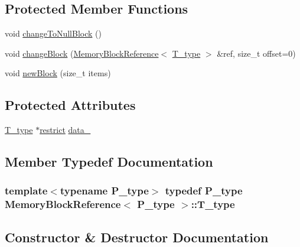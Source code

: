 \subsection*{Protected Member Functions}
\begin{DoxyCompactItemize}
\item 
void \hyperlink{classMemoryBlockReference_ae3e3d72bd8f0fe616f4cd5e7cd3edc3d}{change\+To\+Null\+Block} ()
\item 
void \hyperlink{classMemoryBlockReference_abfef63aad616c86184a56e0568007cd0}{change\+Block} (\hyperlink{classMemoryBlockReference}{Memory\+Block\+Reference}$<$ \hyperlink{classMemoryBlockReference_abf67312980afa9874edcdacc5d3f3eb3}{T\+\_\+type} $>$ \&ref, size\+\_\+t offset=0)
\item 
void \hyperlink{classMemoryBlockReference_aababf2bfce2ddec2da4406309da250dc}{new\+Block} (size\+\_\+t items)
\end{DoxyCompactItemize}
\subsection*{Protected Attributes}
\begin{DoxyCompactItemize}
\item 
\hyperlink{classMemoryBlockReference_abf67312980afa9874edcdacc5d3f3eb3}{T\+\_\+type} $\ast$\hyperlink{compiler_8h_a080abdcb9c02438f1cd2bb707af25af8}{restrict} \hyperlink{classMemoryBlockReference_aa357e2cf55a9eac0da062e7e0c27a07a}{data\+\_\+}
\end{DoxyCompactItemize}


\subsection{Member Typedef Documentation}
\hypertarget{classMemoryBlockReference_abf67312980afa9874edcdacc5d3f3eb3}{}
\subsubsection[{T\+\_\+type}]{\setlength{\rightskip}{0pt plus 5cm}template$<$typename P\+\_\+type$>$ typedef P\+\_\+type {\bf Memory\+Block\+Reference}$<$ P\+\_\+type $>$\+::{\bf T\+\_\+type}}\label{classMemoryBlockReference_abf67312980afa9874edcdacc5d3f3eb3}


\subsection{Constructor \& Destructor Documentation}
\hypertarget{classMemoryBlockReference_a60dea46292bf937fcd039e4ac4388dc1}{}
